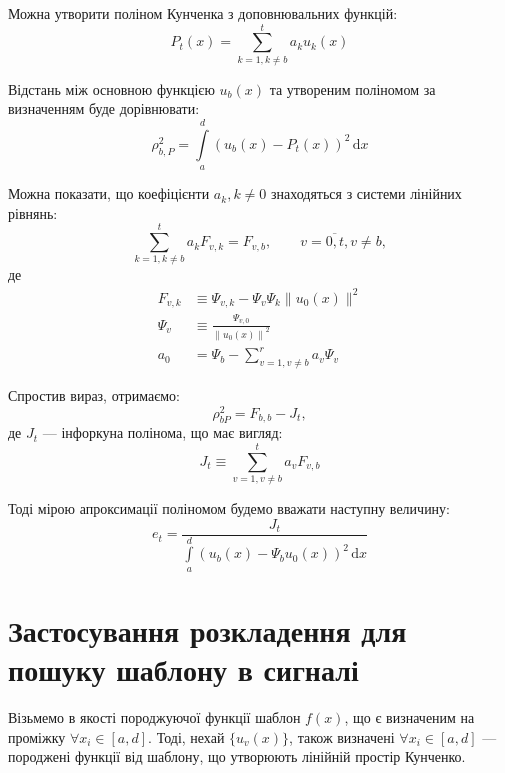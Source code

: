     Можна утворити поліном Кунченка з доповнювальних функцій:
    \begin{equation}
        \label{eq:polynom}
        P_t( x ) = \sum^t_{k = 1, k \ne b} a_k u_k( x  )
    \end{equation}

    Відстань між основною функцією $u_b(x)$ та утвореним поліномом за визначенням буде дорівнювати:
    \begin{equation}
        \rho^2_{b,P} = \int\limits_a^d\left( u_b(x) - P_t(x)\right)^2 \, \mathrm{d}x
    \end{equation}

    Можна показати, що коефіцієнти $a_k, k \ne 0$ знаходяться з системи лінійних рівнянь:
    \begin{equation}
        \label{eq:linear-system}
        \sum^t_{k=1,k\ne b} a_k F_{v,k} = F_{v,b},\qquad v=\overline{0,t}, v \ne b,
    \end{equation}
    де
    \begin{align}
        \label{eq:centered-correlants}
        F_{v,k} &\equiv \Psi_{v,k} - \Psi_v \Psi_k \| u_0( x ) \|^2\\
        \Psi_v &\equiv \frac{\Psi_{v,0}}{\left\|u_0(x)\right\|^2}\\
        a_0 &= \Psi_b - \sum\limits_{v=1, v \ne b}^r{a_v \Psi_v}
    \end{align}

    Спростив вираз, отримаємо:
    \begin{equation}
        \rho^2_{bP} = F_{b,b} - J_t,
    \end{equation}
    де $J_t$ --- інфоркуна полінома, що має вигляд:
    \begin{equation}
        J_t \equiv \sum_{v=1,v\ne b}^t a_v F_{v,b}
    \end{equation}

    Тоді мірою апроксимації поліномом будемо вважати наступну величину:
    \begin{equation}
        \label{eq:et}
        e_t = \frac{J_t}{\int\limits_a^d (u_b(x)-\Psi_b u_0( x ))^2\, \mathrm{d}x}
    \end{equation}

\section{Застосування розкладення для пошуку шаблону в сигналі}
    Візьмемо в якості породжуючої функції шаблон $f(x)$, що є визначеним на проміжку $\forall x_i \in {[a, d]}$.
    Тоді, нехай $\{u_v(x)\}$, також визначені $\forall x_i \in {[a, d]}$ --- породжені функції від шаблону, що
    утворюють лінійній простір Кунченко.

